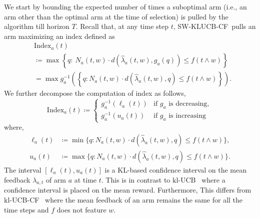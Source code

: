 \documentclass[letterpaper]{article} %
\newcommand{\defined}{\coloneqq}
\newcommand{\KLUCBCF}{$\mathrm{kl}$-\textsc{UCB-CF}}
\newcommand{\SWKLUCBCF}{\textsc{SW-KLUCB-CF}}
\newcommand{\KLUCB}{$\mathrm{kl}$-\textsc{UCB}}
\newcommand{\meanFeedback}[2]{\lambda_{#1, #2}}
\newcommand{\windowsize}{w}
\begin{document}
We start by bounding the expected number of times a suboptimal arm (i.e., an arm other than the optimal arm at the time of selection) is pulled by the algorithm till horizon $T$. Recall that, at any time step $t$, \SWKLUCBCF \ pulls an arm maximizing an index defined as
\begin{align*}
& \mathrm{Index}_a(t) \\
&\defined \max \left\{ q:\  N_a(t, \windowsize)\cdot{}d\left(\hat{\lambda}_a(t, \windowsize), g_a(q)\right) \leq f\left(t \wedge \windowsize\right) \right\} \\
&= \max g_a^{-1}\left( \left\{q: N_a(t, \windowsize)\cdot{}d\left(\hat{\lambda}_a(t, \windowsize), q\right) \leq f\left(t \wedge \windowsize\right)\right\} \right).
\end{align*}  We further decompose the computation of index as follows,
$$\mathrm{Index}_a(t) \defined
\begin{cases}
g_a^{-1}({\ell_a(t)}) & \text{if } g_a \text{ is decreasing}, \\
g_a^{-1}({u_a(t)}) & \text{if } g_a \text{ is increasing}
\end{cases}
$$
where,
\begin{align*}
\ell_a(t)  &\defined  \min \Big\{q: N_a(t, \windowsize)\cdot{}d\left(\hat{\lambda}_a(t, \windowsize), q\right) \leq f\left( t \wedge \windowsize \right)\Big\}, \\
u_a(t)  &\defined  \max \Big\{q: N_a(t, \windowsize)\cdot{}d\left(\hat{\lambda}_a(t, \windowsize), q\right) \leq f\left( t \wedge\windowsize \right) \Big\}.
\end{align*}  The interval $[\ell_a(t), u_a(t)]$ is a KL-based confidence interval on the mean feedback $\meanFeedback{a}{t}$ of arm $a$ at time $t$.
This is in contrast to \KLUCB\ \citep{KLUCBJournal} where a confidence interval is placed on the mean reward. Furthermore,
This differs from \KLUCBCF \ \cite{pmlr-v83-gajane18a} where the mean feedback of an arm remains the same for all the time steps and $f$ does not feature $\windowsize$.
\end{document}
